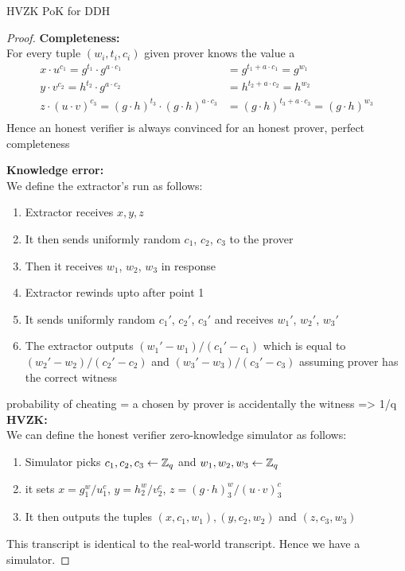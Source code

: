 \begin{solution}{HVZK PoK for DDH}
\begin{proof}
    \textbf{Completeness:}\\
        For every tuple $(w_i,t_i,c_i)$ given prover knows the value a
        \begin{equation}
        \begin{split}
                x\cdot u^{c_1} = g^{t_1}\cdot g^{a\cdot c_1} &= g^{t_1+a\cdot c_1} = g^{w_1}\\
                y\cdot v^{c_2} = h^{t_2}\cdot g^{a\cdot c_2} &= h^{t_2+a\cdot c_2} = h^{w_2}\\
                z\cdot (u\cdot v)^{c_3} = (g\cdot h)^{t_3}\cdot (g\cdot h)^{a\cdot c_3} &= (g\cdot h)^{t_3+a\cdot c_3} = (g\cdot h)^{w_3}\\   
        \end{split}
        \end{equation}
        Hence an honest verifier is always convinced for an honest prover, perfect completeness\\
    \newpage

    \textbf{Knowledge error:}\\
    We define the extractor's run as follows: 
    \begin{enumerate}
        \item Extractor receives $x,y,z$
        \item It then sends uniformly random $c_1$, $c_2$, $c_3$ to the prover
        \item Then it receives $w_1$, $w_2$, $w_3$ in response
        \item Extractor rewinds upto after point 1
        \item It sends uniformly random $c_1'$, $c_2'$, $c_3'$ and receives $w_1'$, $w_2'$, $w_3'$
        \item The extractor outputs $(w_1'-w_1)/(c_1'-c_1)$ which is equal to $(w_2'-w_2)/(c_2'-c_2)$ and $(w_3'-w_3)/(c_3'-c_3)$ assuming prover has the correct witness
    \end{enumerate}
    probability of cheating = a chosen by prover is accidentally the witness => 1/q\\

    \textbf{HVZK:}\\
    We can define the honest verifier zero-knowledge simulator as follows:
    \begin{enumerate}
        \item Simulator picks $c_1, c_2, c_3 \leftarrow \mathbb{Z}_q$ and $w_1, w_2, w_3 \leftarrow \mathbb{Z}_q$
        \item it sets $x = g^w_1/u^c_1$, $y = h^w_2/v^c_2$, $z = (g\cdot h)^w_3/(u\cdot v)^c_3$
        \item It then outputs the tuples $(x,c_1,w_1), (y,c_2,w_2)$ and $(z,c_3, w_3)$
    \end{enumerate}
    This transcript is identical to the real-world transcript. Hence we have a simulator.
    \end{proof}
\end{solution}
